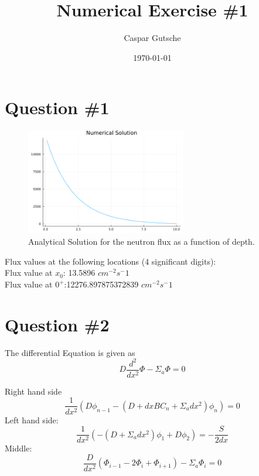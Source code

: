 \documentclass[11pt,a4paper]{article}
\begin{document}
\title{Numerical Exercise \#1}
\author{Caspar Gutsche\\  %
}
\date{\today}
\maketitle



\newpage
\section{Question \#1}
\begin{figure}[h]
\includegraphics[width=7cm]{../figs/ex1/ex1_analytical.png}
\centering
\caption{Analytical Solution for the neutron flux as a function of depth.}
\end{figure}
Flux values at the following locations (4 significant digits):\\
Flux value at $x_0$: 13.5896 $cm^{-2} s^-1$\\
Flux value at $0^+$:12276.897875372839  $cm^{-2} s^-1$ \\


\section{Question \#2}

The differential Equation is given as
\begin{equation}
    D \frac{ d^2 }{ dx^2 } \Phi  -  \Sigma_{a}\Phi = 0
\end{equation}

Right hand side
$$
\frac{1}{dx^2} ( D \phi_{n-1} - (D + dx BC_{n} + \Sigma_{a} dx^2)\phi_{n}) = 0
$$
Left hand side:
$$
\frac{1}{dx^2}(-(D + \Sigma_{a} dx^2) \phi_{1} + D\phi_{2}) = -\frac{S}{2dx}
$$
Middle:
$$
\frac{D}{dx^2}(\Phi_{i-1} - 2 \Phi_{i} + \Phi_{i+1}) - \Sigma_{a} \Phi_{i} = 0
$$
\end{document}
